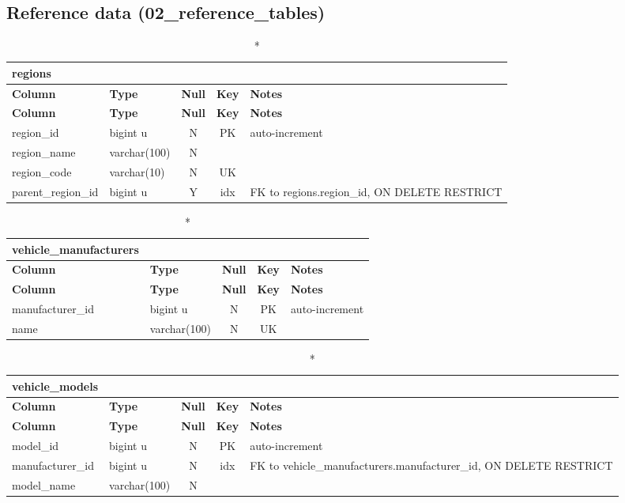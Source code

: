 \subsection*{Reference data (02\_reference\_tables)}
\begin{longtable}{@{}p{3.4cm}p{2.9cm}c c p{5.6cm}@{}}
\caption*{\textbf{regions}}\\
\toprule \textbf{Column} & \textbf{Type} & \textbf{Null} & \textbf{Key} & \textbf{Notes} \\ \midrule \endfirsthead
\toprule \textbf{Column} & \textbf{Type} & \textbf{Null} & \textbf{Key} & \textbf{Notes} \\ \midrule \endhead
\bottomrule \endlastfoot
region\_\allowbreak{}id & bigint u & N & PK & auto-increment \\
region\_\allowbreak{}name & varchar(100) & N &  &  \\
region\_\allowbreak{}code & varchar(10) & N & UK &  \\
parent\_\allowbreak{}region\_\allowbreak{}id & bigint u & Y & idx & FK to regions.region\_\allowbreak{}id, ON DELETE RESTRICT \\
\end{longtable}
\vspace{-0.4em}
\begin{longtable}{@{}p{3.4cm}p{2.9cm}c c p{5.6cm}@{}}
\caption*{\textbf{vehicle\_\allowbreak{}manufacturers}}\\
\toprule \textbf{Column} & \textbf{Type} & \textbf{Null} & \textbf{Key} & \textbf{Notes} \\ \midrule \endfirsthead
\toprule \textbf{Column} & \textbf{Type} & \textbf{Null} & \textbf{Key} & \textbf{Notes} \\ \midrule \endhead
\bottomrule \endlastfoot
manufacturer\_\allowbreak{}id & bigint u & N & PK & auto-increment \\
name & varchar(100) & N & UK &  \\
\end{longtable}
\vspace{-0.4em}
\begin{longtable}{@{}p{3.4cm}p{2.9cm}c c p{5.6cm}@{}}
\caption*{\textbf{vehicle\_\allowbreak{}models}}\\
\toprule \textbf{Column} & \textbf{Type} & \textbf{Null} & \textbf{Key} & \textbf{Notes} \\ \midrule \endfirsthead
\toprule \textbf{Column} & \textbf{Type} & \textbf{Null} & \textbf{Key} & \textbf{Notes} \\ \midrule \endhead
\bottomrule \endlastfoot
model\_\allowbreak{}id & bigint u & N & PK & auto-increment \\
manufacturer\_\allowbreak{}id & bigint u & N & idx & FK to vehicle\_\allowbreak{}manufacturers.manufacturer\_\allowbreak{}id, ON DELETE RESTRICT \\
model\_\allowbreak{}name & varchar(100) & N &  &  \\
\end{longtable}
